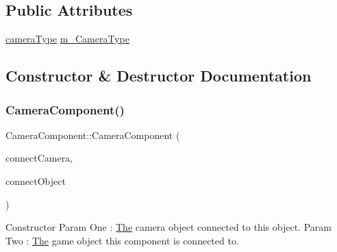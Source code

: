 \subsection*{Public Attributes}
\begin{DoxyCompactItemize}
\item 
\mbox{\hyperlink{_camera_component_8h_ab07ecb557631c59d8b7ec9c3db110dd5}{camera\+Type}} \mbox{\hyperlink{class_camera_component_ac2c53e574361e9069c32baa344e90eae}{m\+\_\+\+Camera\+Type}}
\end{DoxyCompactItemize}


\subsection{Constructor \& Destructor Documentation}
\mbox{\label{class_camera_component_a54997069f98c746e4d6df9e2ce8b5416}} 
\subsubsection{\texorpdfstring{Camera\+Component()}{CameraComponent()}\hspace{0.1cm}{\footnotesize\ttfamily [1/4]}}
{\footnotesize\ttfamily Camera\+Component\+::\+Camera\+Component (\begin{DoxyParamCaption}\item[{\mbox{\hyperlink{class_camera}{Camera}} $\ast$}]{connect\+Camera,  }\item[{\mbox{\hyperlink{class_game_object}{Game\+Object}} $\ast$}]{connect\+Object }\end{DoxyParamCaption})\hspace{0.3cm}{\ttfamily [inline]}}

Constructor Param One \+: \mbox{\hyperlink{class_the}{The}} camera object connected to this object. Param Two \+: \mbox{\hyperlink{class_the}{The}} game object this component is connected to. \mbox{\label{class_camera_component_a638e0e8bf55a52b735f8ab08eb0ad631}} 
